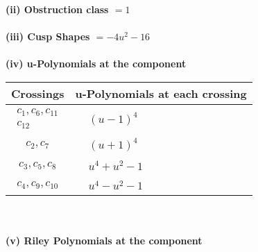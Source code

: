 \documentclass[1p]{elsarticle_modified}
\theoremstyle{definition}
\begin{document}
\flushleft \textbf{(ii) Obstruction class $= 1$}\\~\\
\flushleft \textbf{(iii) Cusp Shapes $= -4 u^2-16$}\\~\\
\newpage\renewcommand{\arraystretch}{1}
\flushleft \textbf{(iv) u-Polynomials at the component}\newline \\
\begin{tabular}{m{50pt}|m{274pt}}
Crossings & \hspace{64pt}u-Polynomials at each crossing \\
\hline $$\begin{aligned}c_{1},c_{6},c_{11}\\c_{12}\end{aligned}$$&$\begin{aligned}
&(u-1)^4
\end{aligned}$\\
\hline $$\begin{aligned}c_{2},c_{7}\end{aligned}$$&$\begin{aligned}
&(u+1)^4
\end{aligned}$\\
\hline $$\begin{aligned}c_{3},c_{5},c_{8}\end{aligned}$$&$\begin{aligned}
&u^4+u^2-1
\end{aligned}$\\
\hline $$\begin{aligned}c_{4},c_{9},c_{10}\end{aligned}$$&$\begin{aligned}
&u^4- u^2-1
\end{aligned}$\\
\hline
\end{tabular}\\~\\
\newpage\renewcommand{\arraystretch}{1}
\flushleft \textbf{(v) Riley Polynomials at the component}\newline \\
\end{document}

